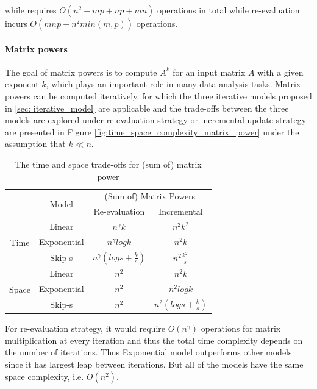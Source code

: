 while requires $O(n^2 + mp + np + mn)$ operations in total while re-evaluation incurs $O(mnp + n^2min(m,p))$ operations.

\paragraph{Matrix powers}
The goal of matrix powers is to compute $A^k$ for an input matrix $A$ with a given exponent $k$, which plays an important role in many data analysis tasks. Matrix powers can be computed iteratively, for which the three iterative models proposed in \ref{sec: iterative_model} are applicable and the trade-offs between the three models are explored under re-evaluation strategy or incremental update strategy are presented in Figure \ref{fig:time_space_complexity_matrix_power} under the assumption that $k \ll n$.

\begin{table}[h]
    \centering
    \begin{tabular}{|c|c|c|c|}\hline
        &\multirow{2}{*}{Model} & \multicolumn{2}{|c|}{(Sum of) Matrix Powers}  \\\hhline{~~--}
        &&Re-evaluation & Incremental\\ \hline
    \multirow{3}{*}{Time}&Linear & $n^{\gamma}k$ & $n^2k^2$\\\hhline{~---}
    &Exponential & $n^{\gamma}logk$ & $n^2k$\\\hhline{~---}
    &Skip-s & $n^{\gamma}(logs+\frac{k}{s})$ & $n^2\frac{k^2}{s}$\\\hline
    \multirow{3}{*}{Space}&Linear & $n^2$ & $n^2k$\\\hhline{~---}
    &Exponential & $n^2$ & $n^2logk$\\\hhline{~---}
    &Skip-s & $n^2$ & $n^2(logs+\frac{k}{s})$\\\hline
    \end{tabular}
    \caption{The time and space trade-offs for (sum of) matrix power}
    \label{tab:time_space_complexity_matrix_power}
\end{table}

For re-evaluation strategy, it would require $O(n^{\gamma})$ operations for matrix multiplication at every iteration and thus the total time complexity depends on the number of iterations. Thus Exponential model outperforms other models since it has largest leap between iterations. But all of the models have the same space complexity, i.e. $O(n^2)$.

